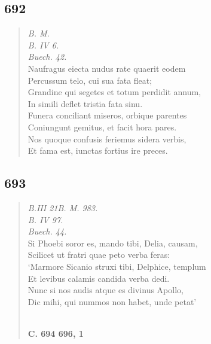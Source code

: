 \documentclass[11pt, a4paper]{report}
\begin{document}
            \subsection*{692}
      \begin{verse}
      \textit{B. M.} \\ \textit{B. IV 6.} \\ \textit{Buech. 42.} \\ Naufragus eiecta nudus rate quaerit eodem \\ Percussum telo, cui sua fata fleat; \\ Grandine qui segetes et totum perdidit annum, \\ In simili deflet tristia fata sinu. \\ Funera conciliant miseros, orbique parentes \\ Coniungunt gemitus, et facit hora pares. \\ Nos quoque confusis feriemus sidera verbis, \\ Et fama est, iunctas fortius ire preces. \\ 
      \end{verse}
  
            \subsection*{693}
      \begin{verse}
      \textit{B.III 21B. M. 983.} \\ \textit{B. IV 97.} \\ \textit{Buech. 44.} \\ Si Phoebi soror es, mando tibi, Delia, causam, \\ Scilicet ut fratri quae peto verba feras: \\ ‘Marmore Sicanio struxi tibi, Delphice, templum \\ Et levibus calamis candida verba dedi. \\ Nunc si nos audis atque es divinus Apollo, \\ Dic mihi, qui nummos non habet, unde petat’ \\ 
        ﻿\pagebreak 
     \marginpar{[169]} \begin{center} \textbf{C. 694 696, 1} \end{center}
      \end{verse}
  
\end{document}
